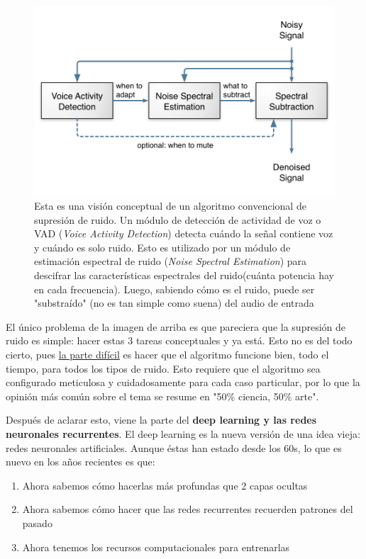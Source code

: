 \documentclass[conference,onecolumn]{IEEEtran}
\begin{document}
 \begin{figure}[H]
 \centering
    \includegraphics[scale=0.7]{noise_suppression.png}
    \caption{Esta es una visión conceptual de un algoritmo convencional de supresión de ruido. Un módulo de detección de actividad de voz o VAD (\textit{Voice Activity Detection}) detecta cuándo la señal contiene voz y cuándo es solo ruido. Esto es utilizado por un módulo de estimación espectral de ruido (\textit{Noise Spectral Estimation}) para descifrar las características espectrales del ruido(cuánta potencia hay en cada frecuencia). Luego, sabiendo cómo es el ruido, puede ser "substraído" (no es tan simple como suena) del audio de entrada}
    \label{Figure 14}
\end{figure}

El único problema de la imagen de arriba es que pareciera que la supresión de ruido es simple: hacer estas 3 tareas conceptuales y ya está. Esto no es del todo cierto, pues \underline{la parte
difícil} es hacer que el algoritmo funcione bien, todo el tiempo, para todos los tipos de ruido. Esto requiere que el algoritmo sea configurado meticulosa y cuidadosamente para cada caso particular, por lo que la opinión más común sobre el tema se resume en "50\% ciencia, 50\% arte".

Después de aclarar esto, viene la parte del \textbf{deep learning y las redes neuronales recurrentes}. El deep learning es la nueva versión de una idea vieja: redes neuronales artificiales. Aunque éstas han estado desde los 60s, lo que es nuevo en los años recientes es que:

\begin{enumerate}
    \item Ahora sabemos cómo hacerlas más profundas que 2 capas ocultas
    \item Ahora sabemos cómo hacer que las redes recurrentes recuerden patrones del pasado
    \item Ahora tenemos los recursos computacionales para entrenarlas
\end{enumerate}
\end{document}
